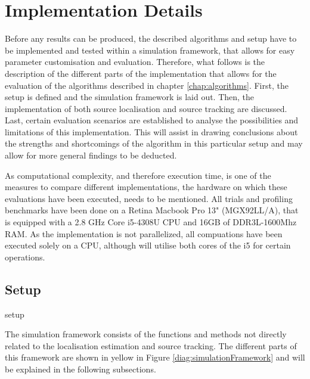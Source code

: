 \chapter{Implementation Details}
\label{chap:implementation}
Before any results can be produced, the described algorithms and setup have to be implemented and tested within a simulation framework, that allows for easy parameter customisation and evaluation. Therefore, what follows is the description of the different parts of the implementation that allows for the evaluation of the algorithms described in chapter \ref{chap:algorithms}. First, the setup is defined and the simulation framework is laid out. Then, the implementation of both source localisation and source tracking are discussed. Last, certain evaluation scenarios are established to analyse the possibilities and limitations of this implementation. This will assist in drawing conclusions about the strengths and shortcomings of the algorithm in this particular setup and may allow for more general findings to be deducted.

As computational complexity, and therefore execution time, is one of the measures to compare different implementations, the hardware on which these evaluations have been executed, needs to be mentioned. All trials and profiling benchmarks have been done on a Retina Macbook Pro 13" (MGX92LL/A), that is equipped with a 2.8 GHz Core i5-4308U CPU and 16GB of DDR3L-1600Mhz RAM. As the implementation is not parallelized, all compuations have been executed solely on a CPU, although \matlab will utilise both cores of the i5 for certain operations.

\section{Setup}
\label{sec:setup}
{setup}

%	

The simulation framework consists of the functions and methods not directly related to the localisation estimation and source tracking. The different parts of this framework are shown in yellow in Figure \ref{diag:simulationFramework} and will be explained in the following subsections.


